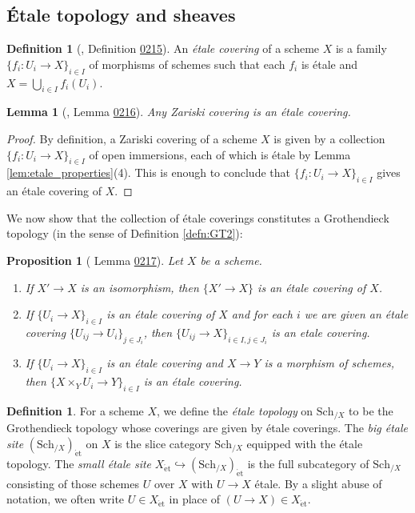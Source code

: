 \documentclass{article}
\numberwithin{equation}{section}
\numberwithin{figure}{section}
\newcommand{\mono}{\hookrightarrow}
\newcommand{\et}{\acute{\mathrm{e}}\mathrm{t}}
\newcommand{\Sch}{\mathrm{Sch}}
\theoremstyle{plain}
\newtheorem{prop}[thm]{Proposition}
\newtheorem{lem}[thm]{Lemma}
\theoremstyle{definition}
\newtheorem{defn}[thm]{Definition}
\theoremstyle{remark}
\begin{document}
\subsection{\'Etale topology and sheaves}

\begin{defn}[\cite{stacks}, Definition \href{https://stacks.math.columbia.edu/tag/0215}{0215}]
    An \emph{\'etale covering} of a scheme $X$ is a family $\{f_i: U_i \to X\}_{i \in I}$ of morphisms of schemes such that each $f_i$ is \'etale and $X = \bigcup_{i \in I} f_i(U_i)$.
\end{defn}

\begin{lem}[\cite{stacks}, Lemma \href{https://stacks.math.columbia.edu/tag/0216}{0216}]
Any Zariski covering is an \'etale covering.
\end{lem}
\begin{proof}
    By definition, a Zariski covering of a scheme $X$ is given by a collection $\{f_i: U_i \to X\}_{i \in I}$ of open immersions, each of which is \'etale by Lemma \ref{lem:etale_properties}(4). This is enough to conclude that $\{f_i: U_i \to X\}_{i \in I}$ gives an \'etale covering of $X$.
\end{proof}

We now show that the collection of \'etale coverings constitutes a Grothendieck topology (in the sense of Definition \ref{defn:GT2}):

\begin{prop}[\cite{stacks} Lemma \href{https://stacks.math.columbia.edu/tag/0217}{0217}]
    Let $X$ be a scheme.
    \begin{enumerate}
        \item If $X' \to X$ is an isomorphism, then $\{X' \to X\}$ is an \'etale covering of $X$. 
        \item If $\{U_i \to X\}_{i \in I}$ is an \'etale covering of $X$ and for each $i$ we are given an \'etale covering $\{U_{ij} \to U_i\}_{j \in J_i}$, then $\{U_{ij} \to X\}_{i \in I, j \in J_i}$ is an etale covering. 
        \item If $\{U_i \to X\}_{i \in I}$ is an \'etale covering and $X \to Y$ is a morphism of schemes, then $\{X \times_Y U_i \to Y\}_{i \in I}$ is an \'etale covering.
    \end{enumerate}
\end{prop}

\begin{defn}
    For a scheme $X$, we define the \emph{\'etale topology} on $\Sch_{/X}$ to be the Grothendieck topology whose coverings are given by \'etale coverings. The \emph{big \'etale site} $\left(\Sch_{/X}\right)_{\et}$ on $X$ is the slice category $\Sch_{/X}$ equipped with the \'etale topology. The \emph{small \'etale site} $X_{\et} \mono \left(\Sch_{/X}\right)_{\et}$ is the full subcategory of $\Sch_{/X}$ consisting of those schemes $U$ over $X$ with $U \to X$ \'etale. By a slight abuse of notation, we often write $U \in X_{\et}$ in place of $(U \to X) \in X_{\et}$.
\end{defn}
\end{document}
